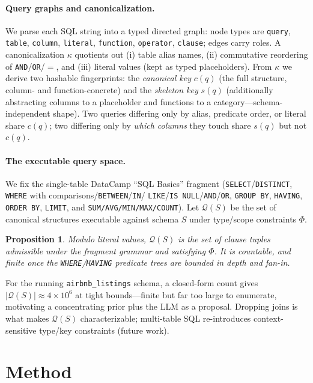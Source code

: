 \documentclass[11pt]{article}
\newtheorem{proposition}{Proposition}
\newcommand{\Qspace}{\mathcal{Q}(S)}
\begin{document}
\paragraph{Query graphs and canonicalization.} We parse each SQL string into a typed directed graph:
node types are \texttt{query}, \texttt{table}, \texttt{column}, \texttt{literal}, \texttt{function},
\texttt{operator}, \texttt{clause}; edges carry roles. A canonicalization $\kappa$ quotients out
(i) table alias names, (ii) commutative reordering of \texttt{AND}/\texttt{OR}/$=$, and (iii) literal
values (kept as typed placeholders). From $\kappa$ we derive two hashable fingerprints: the
\emph{canonical key} $c(q)$ (the full structure, column- and function-concrete) and the
\emph{skeleton key} $s(q)$ (additionally abstracting columns to a placeholder and functions to a
category---schema-independent shape). Two queries differing only by alias, predicate order, or
literal share $c(q)$; two differing only by \emph{which columns} they touch share $s(q)$ but not
$c(q)$.

\paragraph{The executable query space.} We fix the single-table DataCamp ``SQL Basics'' fragment
(\texttt{SELECT}/\texttt{DISTINCT}, \texttt{WHERE} with comparisons/\texttt{BETWEEN}/\texttt{IN}/%
\texttt{LIKE}/\texttt{IS\,NULL}/\texttt{AND}/\texttt{OR}, \texttt{GROUP\,BY}, \texttt{HAVING},
\texttt{ORDER\,BY}, \texttt{LIMIT}, and \texttt{SUM/AVG/MIN/MAX/COUNT}). Let $\Qspace$ be the set of
canonical structures executable against schema $S$ under type/scope constraints $\Phi$.

\begin{proposition}\label{prop:space}
Modulo literal values, $\Qspace$ is the set of clause tuples admissible under the fragment grammar
and satisfying $\Phi$. It is countable, and finite once the \texttt{WHERE}/\texttt{HAVING} predicate
trees are bounded in depth and fan-in.
\end{proposition}
For the running \texttt{airbnb\_listings} schema, a closed-form count gives $|\Qspace|\approx 4{\times}10^{6}$
at tight bounds---finite but far too large to enumerate, motivating a concentrating prior plus the LLM
as a proposal. Dropping joins is what makes $\Qspace$ characterizable; multi-table SQL re-introduces
context-sensitive type/key constraints (future work).

\section{Method}\label{sec:method}
\end{document}
